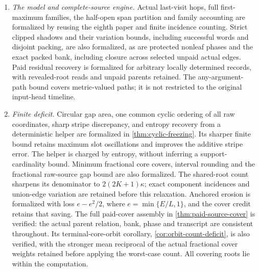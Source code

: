 \begin{enumerate}
\item \emph{The model and complete-source engine.}
Actual last-visit hops, full first-maximum families, the half-open span
partition and family accounting are formalized by reusing the eighth
paper and finite incidence counting. Strict clipped shadows and their
variation bounds, including successful words and disjoint packing, are
also formalized, as are protected nonleaf phases and the exact packed bank,
including closure across selected unpaid actual edges. Paid residual recovery
is formalized for arbitrary locally determined records, with revealed-root
reads and unpaid parents retained. The any-argument-path bound covers metric-valued paths;
it is not restricted to the original input-head timeline.

\item \emph{Finite deficit.}
Circular gap area, one common cyclic ordering of all raw coordinates,
sharp stripe discrepancy, and entropy recovery from a deterministic helper
are formalized in \cref{thm:cyclic-freezing}. Its sharper finite bound
retains maximum slot oscillations and improves the additive stripe error.
The helper is charged by entropy, without inferring a support-cardinality
bound. Minimum fractional core covers, interval rounding and the fractional
raw-source gap bound are also formalized. The shared-root count sharpens
its denominator to $2(2K+1)\kappa$; exact component incidences and
union-edge variation are retained before this relaxation.
Anchored erosion is formalized with loss $e-e^2/2$, where
$e=\min\{E/L,1\}$, and the cover credit retains that saving.
The full paid-cover assembly in \cref{thm:paid-source-cover} is verified:
the actual parent relation, bank, phase and transcript are consistent
throughout. Its terminal-core-orbit corollary,
\cref{cor:orbit-count-deficit}, is also verified, with the stronger mean
reciprocal of the actual fractional cover weights retained before applying
the worst-case count. All covering roots lie within the computation.


\end{enumerate}
